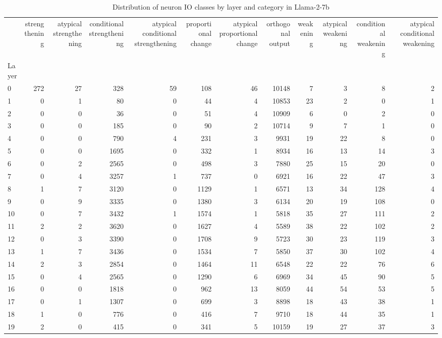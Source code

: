 \begin{table}
\caption{Distribution of neuron IO classes by layer and category in Llama-2-7b}
\label{tab:Llama-2-7b}
\begin{tabular}{lrrrrrrrrrrr}
 & strengthening & atypical strengthening & conditional strengthening & atypical conditional strengthening & proportional change & atypical proportional change & orthogonal output & weakening & atypical weakening & conditional weakening & atypical conditional weakening \\
Layer &  &  &  &  &  &  &  &  &  &  &  \\
0 & 272 & 27 & 328 & 59 & 108 & 46 & 10148 & 7 & 3 & 8 & 2 \\
1 & 0 & 1 & 80 & 0 & 44 & 4 & 10853 & 23 & 2 & 0 & 1 \\
2 & 0 & 0 & 36 & 0 & 51 & 4 & 10909 & 6 & 0 & 2 & 0 \\
3 & 0 & 0 & 185 & 0 & 90 & 2 & 10714 & 9 & 7 & 1 & 0 \\
4 & 0 & 0 & 790 & 4 & 231 & 3 & 9931 & 19 & 22 & 8 & 0 \\
5 & 0 & 0 & 1695 & 0 & 332 & 1 & 8934 & 16 & 13 & 14 & 3 \\
6 & 0 & 2 & 2565 & 0 & 498 & 3 & 7880 & 25 & 15 & 20 & 0 \\
7 & 0 & 4 & 3257 & 1 & 737 & 0 & 6921 & 16 & 22 & 47 & 3 \\
8 & 1 & 7 & 3120 & 0 & 1129 & 1 & 6571 & 13 & 34 & 128 & 4 \\
9 & 0 & 9 & 3335 & 0 & 1380 & 3 & 6134 & 20 & 19 & 108 & 0 \\
10 & 0 & 7 & 3432 & 1 & 1574 & 1 & 5818 & 35 & 27 & 111 & 2 \\
11 & 2 & 2 & 3620 & 0 & 1627 & 4 & 5589 & 38 & 22 & 102 & 2 \\
12 & 0 & 3 & 3390 & 0 & 1708 & 9 & 5723 & 30 & 23 & 119 & 3 \\
13 & 1 & 7 & 3436 & 0 & 1534 & 7 & 5850 & 37 & 30 & 102 & 4 \\
14 & 2 & 3 & 2854 & 0 & 1464 & 11 & 6548 & 22 & 22 & 76 & 6 \\
15 & 0 & 4 & 2565 & 0 & 1290 & 6 & 6969 & 34 & 45 & 90 & 5 \\
16 & 0 & 0 & 1818 & 0 & 962 & 13 & 8059 & 44 & 54 & 53 & 5 \\
17 & 0 & 1 & 1307 & 0 & 699 & 3 & 8898 & 18 & 43 & 38 & 1 \\
18 & 1 & 0 & 776 & 0 & 416 & 7 & 9710 & 18 & 44 & 35 & 1 \\
19 & 2 & 0 & 415 & 0 & 341 & 5 & 10159 & 19 & 27 & 37 & 3 \\

\end{tabular}
\end{table}
